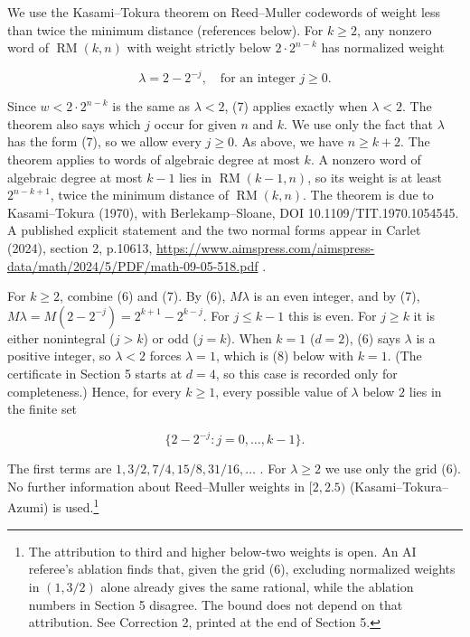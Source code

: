 \documentclass[11pt]{article}
\theoremstyle{remark}
\theoremstyle{correctionstyle}
\begin{document}
\leavevmode\label{src-p050}We use the Kasami--Tokura theorem on Reed--Muller codewords of weight
less than twice the minimum distance (references below). For $k\ge2$, any nonzero
word of $\operatorname{RM}(k,n)$ with weight strictly below $2\cdot2^{n-k}$ has
normalized weight\label{src-end-p050}\par

\begin{equation}
\lambda=2-2^{-j},\quad\text{for an integer }j\ge0.\tag{7}
\label{src-p051}
\end{equation}

\leavevmode\label{src-p052}Since $w<2\cdot2^{n-k}$ is the same as $\lambda<2$, (7) applies exactly
when $\lambda<2$. The theorem also says which $j$ occur for given $n$ and $k$. We use
only the fact that $\lambda$ has the form (7), so we allow every $j\ge0$. As above,
we have $n\ge k+2$. The theorem applies to words of algebraic degree at most $k$. A
nonzero word of algebraic degree at most $k-1$ lies in $\operatorname{RM}(k-1,n)$, so
its weight is at least $2^{n-k+1}$, twice the minimum distance of
$\operatorname{RM}(k,n)$. The theorem is due to Kasami--Tokura (1970), with Berlekamp--Sloane, DOI
10.1109/TIT.1970.1054545. A published explicit statement and the two
normal forms appear in Carlet (2024), section 2, p.10613,
\url{https://www.aimspress.com/aimspress-data/math/2024/5/PDF/math-09-05-518.pdf} .\label{src-end-p052}\par

\leavevmode\label{src-p053}For $k\ge2$, combine (6) and (7). By (6), $M\lambda$ is an even integer, and by (7),
$M\lambda=M(2-2^{-j})=2^{k+1}-2^{k-j}$. For $j\le k-1$ this is even. For $j\ge k$ it is
either nonintegral ($j>k$) or odd ($j=k$). When $k=1$ ($d=2$), (6) says $\lambda$ is a
positive integer, so $\lambda<2$ forces $\lambda=1$, which is (8) below with $k=1$. (The
certificate in Section 5 starts at $d=4$, so this case is recorded only for completeness.)
Hence, for every $k\ge1$, every possible value of $\lambda$ below $2$ lies in the finite set\label{src-end-p053}\par

\begin{equation}
\{2-2^{-j}:j=0,\ldots,k-1\}.\tag{8}
\label{src-p054}
\end{equation}

\leavevmode\label{src-p055}The first terms are $1,3/2,7/4,15/8,31/16,\ldots$ . For $\lambda\ge2$ we use
only the grid (6). No further information about Reed--Muller weights in $[2,2.5)$
(Kasami--Tokura--Azumi) is used.\footnote{The attribution to third and higher below-two
weights is open. An AI referee's ablation finds that, given the grid (6), excluding
normalized weights in $(1,3/2)$ alone already gives the same rational, while the
ablation numbers in Section 5 disagree. The bound does not depend on that
attribution. See Correction 2, printed at the end of Section 5.}\label{src-end-p055}\par
\end{document}
